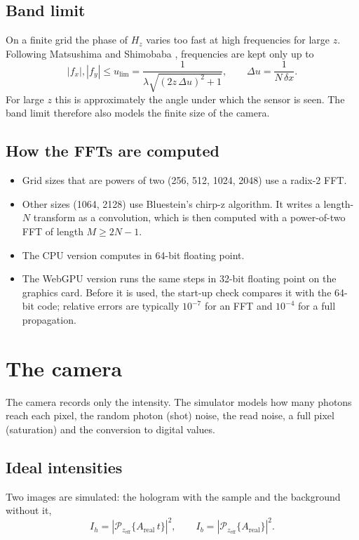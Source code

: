 \documentclass[12pt,a4paper]{article}
\newcommand{\Prop}{\mathcal{P}}
\begin{document}
\subsection{Band limit}
On a finite grid the phase of $H_z$ varies too fast at high frequencies for large $z$. Following Matsushima and Shimobaba \cite{Matsushima}, frequencies are kept only up to
\begin{equation}
|f_x|,|f_y|\le u_\mathrm{lim}=\frac{1}{\lambda\sqrt{(2z\,\Delta u)^2+1}},\qquad \Delta u=\frac{1}{N\,\delta x}.
\end{equation}
For large $z$ this is approximately the angle under which the sensor is seen. The band limit therefore also models the finite size of the camera.

\subsection{How the FFTs are computed}
\begin{itemize}
\item Grid sizes that are powers of two (256, 512, 1024, 2048) use a radix-2 FFT.
\item Other sizes (1064, 2128) use Bluestein's chirp-z algorithm. It writes a length-$N$ transform as a convolution, which is then computed with a power-of-two FFT of length $M\ge2N-1$.
\item The CPU version computes in 64-bit floating point.
\item The WebGPU version runs the same steps in 32-bit floating point on the graphics card. Before it is used, the start-up check compares it with the 64-bit code; relative errors are typically $10^{-7}$ for an FFT and $10^{-4}$ for a full propagation.
\end{itemize}

\section{The camera}
\label{sec:camera}

\begin{short}
The camera records only the intensity. The simulator models how many photons reach each pixel,
the random photon (shot) noise, the read noise, a full pixel (saturation) and the conversion to
digital values.
\end{short}

\subsection{Ideal intensities}
Two images are simulated: the hologram with the sample and the background without it,
\begin{equation}
I_h=\left|\Prop_{z_\mathrm{eff}}\{A_\mathrm{real}\,t\}\right|^2,\qquad
I_b=\left|\Prop_{z_\mathrm{eff}}\{A_\mathrm{real}\}\right|^2.
\end{equation}
\end{document}
